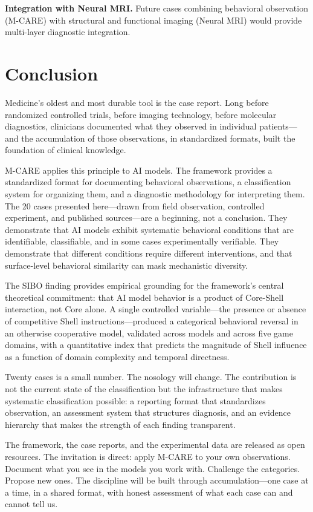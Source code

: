 \documentclass[11pt]{article}
\begin{document}
\textbf{Integration with Neural MRI.} Future cases combining behavioral observation (M-CARE) with structural and functional imaging (Neural MRI) would provide multi-layer diagnostic integration.

\section{Conclusion}

Medicine's oldest and most durable tool is the case report. Long before randomized controlled trials, before imaging technology, before molecular diagnostics, clinicians documented what they observed in individual patients---and the accumulation of those observations, in standardized formats, built the foundation of clinical knowledge.

M-CARE applies this principle to AI models. The framework provides a standardized format for documenting behavioral observations, a classification system for organizing them, and a diagnostic methodology for interpreting them. The 20 cases presented here---drawn from field observation, controlled experiment, and published sources---are a beginning, not a conclusion. They demonstrate that AI models exhibit systematic behavioral conditions that are identifiable, classifiable, and in some cases experimentally verifiable. They demonstrate that different conditions require different interventions, and that surface-level behavioral similarity can mask mechanistic diversity.

The SIBO finding provides empirical grounding for the framework's central theoretical commitment: that AI model behavior is a product of Core-Shell interaction, not Core alone. A single controlled variable---the presence or absence of competitive Shell instructions---produced a categorical behavioral reversal in an otherwise cooperative model, validated across models and across five game domains, with a quantitative index that predicts the magnitude of Shell influence as a function of domain complexity and temporal directness.

Twenty cases is a small number. The nosology will change. The contribution is not the current state of the classification but the infrastructure that makes systematic classification possible: a reporting format that standardizes observation, an assessment system that structures diagnosis, and an evidence hierarchy that makes the strength of each finding transparent.

The framework, the case reports, and the experimental data are released as open resources. The invitation is direct: apply M-CARE to your own observations. Document what you see in the models you work with. Challenge the categories. Propose new ones. The discipline will be built through accumulation---one case at a time, in a shared format, with honest assessment of what each case can and cannot tell us.


\end{document}
